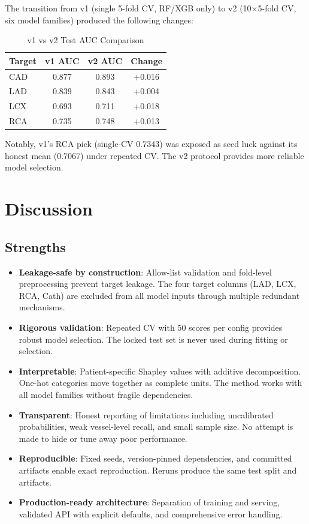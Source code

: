 \documentclass[conference]{IEEEtran}
\begin{document}
The transition from v1 (single 5-fold CV, RF/XGB only) to v2 (10$\times$5-fold CV, six model families) produced the following changes:

\begin{table}[htbp]
\centering
\caption{v1 vs v2 Test AUC Comparison}
\label{tab:v1v2}
\begin{tabular}{lccc}
\toprule
\textbf{Target} & \textbf{v1 AUC} & \textbf{v2 AUC} & \textbf{Change} \\
\midrule
CAD & 0.877 & 0.893 & +0.016 \\
LAD & 0.839 & 0.843 & +0.004 \\
LCX & 0.693 & 0.711 & +0.018 \\
RCA & 0.735 & 0.748 & +0.013 \\
\bottomrule
\end{tabular}
\end{table}

Notably, v1's RCA pick (single-CV 0.7343) was exposed as seed luck against its honest mean (0.7067) under repeated CV. The v2 protocol provides more reliable model selection.

\section{Discussion}

\subsection{Strengths}

\begin{itemize}
    \item \textbf{Leakage-safe by construction}: Allow-list validation and fold-level preprocessing prevent target leakage. The four target columns (LAD, LCX, RCA, Cath) are excluded from all model inputs through multiple redundant mechanisms.
    \item \textbf{Rigorous validation}: Repeated CV with 50 scores per config provides robust model selection. The locked test set is never used during fitting or selection.
    \item \textbf{Interpretable}: Patient-specific Shapley values with additive decomposition. One-hot categories move together as complete units. The method works with all model families without fragile dependencies.
    \item \textbf{Transparent}: Honest reporting of limitations including uncalibrated probabilities, weak vessel-level recall, and small sample size. No attempt is made to hide or tune away poor performance.
    \item \textbf{Reproducible}: Fixed seeds, version-pinned dependencies, and committed artifacts enable exact reproduction. Reruns produce the same test split and artifacts.
    \item \textbf{Production-ready architecture}: Separation of training and serving, validated API with explicit defaults, and comprehensive error handling.
\end{itemize}
\end{document}
